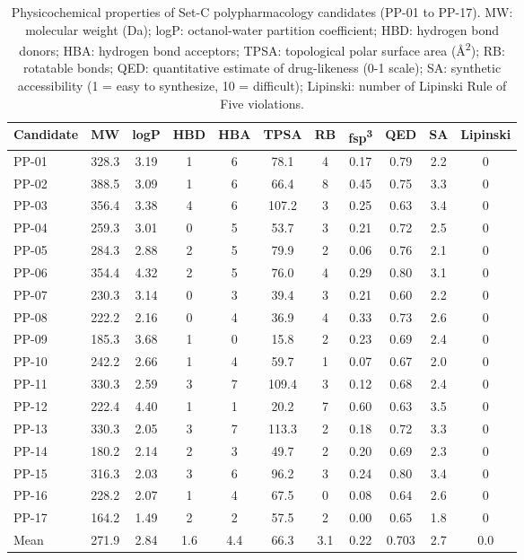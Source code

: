 \begin{table}[ht!]
\centering
\caption{Physicochemical properties of Set-C polypharmacology candidates (PP-01 to PP-17). MW: molecular weight (Da); logP: octanol-water partition coefficient; HBD: hydrogen bond donors; HBA: hydrogen bond acceptors; TPSA: topological polar surface area (\si{\angstrom\squared}); RB: rotatable bonds; QED: quantitative estimate of drug-likeness (0-1 scale); SA: synthetic accessibility (1 = easy to synthesize, 10 = difficult); Lipinski: number of Lipinski Rule of Five violations.}
\label{tab:physichem}
\small
\begin{tabular}{lcccccccccc}
\toprule
Candidate & MW & logP & HBD & HBA & TPSA & RB & fsp\textsuperscript{3} & QED & SA & Lipinski \\
\midrule
PP-01 & 328.3 & 3.19 & 1 & 6 & 78.1 & 4 & 0.17 & 0.79 & 2.2 & 0 \\
PP-02 & 388.5 & 3.09 & 1 & 6 & 66.4 & 8 & 0.45 & 0.75 & 3.3 & 0 \\
PP-03 & 356.4 & 3.38 & 4 & 6 & 107.2 & 3 & 0.25 & 0.63 & 3.4 & 0 \\
PP-04 & 259.3 & 3.01 & 0 & 5 & 53.7 & 3 & 0.21 & 0.72 & 2.5 & 0 \\
PP-05 & 284.3 & 2.88 & 2 & 5 & 79.9 & 2 & 0.06 & 0.76 & 2.1 & 0 \\
PP-06 & 354.4 & 4.32 & 2 & 5 & 76.0 & 4 & 0.29 & 0.80 & 3.1 & 0 \\
PP-07 & 230.3 & 3.14 & 0 & 3 & 39.4 & 3 & 0.21 & 0.60 & 2.2 & 0 \\
PP-08 & 222.2 & 2.16 & 0 & 4 & 36.9 & 4 & 0.33 & 0.73 & 2.6 & 0 \\
PP-09 & 185.3 & 3.68 & 1 & 0 & 15.8 & 2 & 0.23 & 0.69 & 2.4 & 0 \\
PP-10 & 242.2 & 2.66 & 1 & 4 & 59.7 & 1 & 0.07 & 0.67 & 2.0 & 0 \\
PP-11 & 330.3 & 2.59 & 3 & 7 & 109.4 & 3 & 0.12 & 0.68 & 2.4 & 0 \\
PP-12 & 222.4 & 4.40 & 1 & 1 & 20.2 & 7 & 0.60 & 0.63 & 3.5 & 0 \\
PP-13 & 330.3 & 2.05 & 3 & 7 & 113.3 & 2 & 0.18 & 0.72 & 3.3 & 0 \\
PP-14 & 180.2 & 2.14 & 2 & 3 & 49.7 & 2 & 0.20 & 0.69 & 2.3 & 0 \\
PP-15 & 316.3 & 2.03 & 3 & 6 & 96.2 & 3 & 0.24 & 0.80 & 3.4 & 0 \\
PP-16 & 228.2 & 2.07 & 1 & 4 & 67.5 & 0 & 0.08 & 0.64 & 2.6 & 0 \\
PP-17 & 164.2 & 1.49 & 2 & 2 & 57.5 & 2 & 0.00 & 0.65 & 1.8 & 0 \\
\midrule
Mean & 271.9 & 2.84 & 1.6 & 4.4 & 66.3 & 3.1 & 0.22 & 0.703 & 2.7 & 0.0 \\
\bottomrule
\end{tabular}
\end{table}